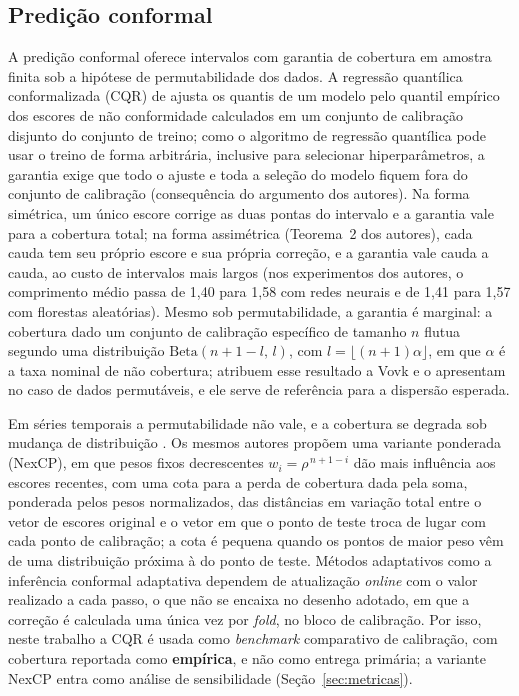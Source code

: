\subsection{Predição conformal}
A predição conformal oferece intervalos com garantia de cobertura em amostra finita sob a hipótese de permutabilidade dos dados. A regressão quantílica conformalizada (CQR) de  ajusta os quantis de um modelo pelo quantil empírico dos escores de não conformidade calculados em um conjunto de calibração disjunto do conjunto de treino; como o algoritmo de regressão quantílica pode usar o treino de forma arbitrária, inclusive para selecionar hiperparâmetros, a garantia exige que todo o ajuste e toda a seleção do modelo fiquem fora do conjunto de calibração (consequência do argumento dos autores). Na forma simétrica, um único escore corrige as duas pontas do intervalo e a garantia vale para a cobertura total; na forma assimétrica (Teorema~2 dos autores), cada cauda tem seu próprio escore e sua própria correção, e a garantia vale cauda a cauda, ao custo de intervalos mais largos (nos experimentos dos autores, o comprimento médio passa de 1,40 para 1,58 com redes neurais e de 1,41 para 1,57 com florestas aleatórias). Mesmo sob permutabilidade, a garantia é marginal: a cobertura dado um conjunto de calibração específico de tamanho \(n\) flutua segundo uma distribuição \(\mathrm{Beta}(n+1-l,\, l)\), com \(l = \lfloor (n+1)\alpha \rfloor\), em que \(\alpha\) é a taxa nominal de não cobertura;  atribuem esse resultado a Vovk e o apresentam no caso de dados permutáveis, e ele serve de referência para a dispersão esperada.

Em séries temporais a permutabilidade não vale, e a cobertura se degrada sob mudança de distribuição \cite{BARBER2023}. Os mesmos autores propõem uma variante ponderada (NexCP), em que pesos fixos decrescentes \(w_i = \rho^{\,n+1-i}\) dão mais influência aos escores recentes, com uma cota para a perda de cobertura dada pela soma, ponderada pelos pesos normalizados, das distâncias em variação total entre o vetor de escores original e o vetor em que o ponto de teste troca de lugar com cada ponto de calibração; a cota é pequena quando os pontos de maior peso vêm de uma distribuição próxima à do ponto de teste. Métodos adaptativos como a inferência conformal adaptativa \cite{GIBBS2021} dependem de atualização \textit{online} com o valor realizado a cada passo, o que não se encaixa no desenho adotado, em que a correção é calculada uma única vez por \textit{fold}, no bloco de calibração. Por isso, neste trabalho a CQR é usada como \textit{benchmark} comparativo de calibração, com cobertura reportada como \textbf{empírica}, e não como entrega primária; a variante NexCP entra como análise de sensibilidade (Seção~\ref{sec:metricas}).

